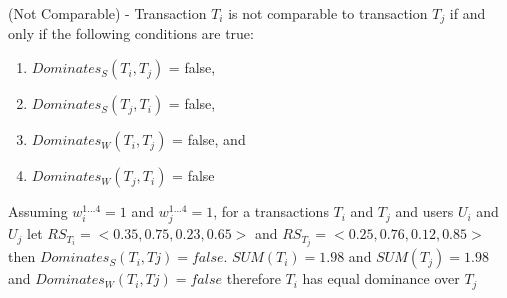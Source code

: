 \begin{definition}
\label{def:not_comparable}
(Not Comparable) - Transaction $T_{i}$ is not comparable to transaction $T_{j}$ if and only if the following conditions are true:

\begin{enumerate}
    \item $Dominates_{S}(T_{i},T_{j})$ = false,
    \item $Dominates_{S}(T_{j},T_{i})$ = false,
    \item $Dominates_{W}(T_{i},T_{j})$ = false, and
    \item $Dominates_{W}(T_{j},T_{i})$ = false
\end{enumerate}

\begin{example}
Assuming $w_{i}^{1...4} = 1$ and $w_{j}^{1...4} = 1$, for a transactions $T_{i}$ and $T_{j}$ and users $U_{i}$ and $U_{j}$ let $RS_{T_{i}} = <0.35,0.75,0.23,0.65>$ and $RS_{T_{j}} = <0.25,0.76,0.12,0.85>$ then $Dominates_{S}(T_{i},T{j}) = false$. $SUM(T_{i}) = 1.98$ and $SUM(T_{j}) = 1.98$ and $Dominates_{W}(T_{i},T{j}) = false$ therefore $T_{i}$ has equal dominance over $T_{j}$
\end{example}
\end{definition}





